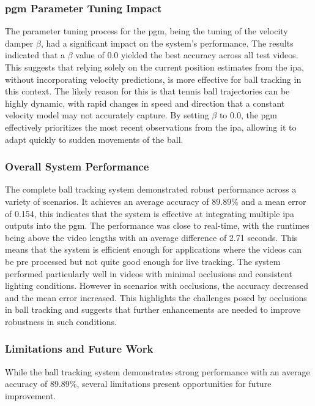 \documentclass[12pt,a4paper]{article}
\begin{document}
\subsubsection{\acs{pgm} Parameter Tuning Impact}
The parameter tuning process for the \acs{pgm}, being the tuning of the velocity damper $\beta$, had a significant impact on the system's performance. The results indicated that a $\beta$ value of 0.0 yielded the best accuracy across all test videos. This suggests that relying solely on the current position estimates from the \acs{ipa}, without incorporating velocity predictions, is more effective for ball tracking in this context. The likely reason for this is that tennis ball trajectories can be highly dynamic, with rapid changes in speed and direction that a constant velocity model may not accurately capture. By setting $\beta$ to 0.0, the \acs{pgm} effectively prioritizes the most recent observations from the \acs{ipa}, allowing it to adapt quickly to sudden movements of the ball.

\subsubsection{Overall System Performance}
The complete ball tracking system demonstrated robust performance across a variety of scenarios. It achieves an average accuracy of 89.89\% and a mean error of 0.154, this indicates that the system is effective at integrating multiple \acs{ipa} outputs into the \acs{pgm}. The performance was close to real-time, with the runtimes being above the video lengths with an average difference of 2.71 seconds. This means that the system is efficient enough for applications where the videos can be pre processed but not quite good enough for live tracking. The system performed particularly well in videos with minimal occlusions and consistent lighting conditions. However in scenarios with occlusions, the accuracy decreased and the mean error increased. This highlights the challenges posed by occlusions in ball tracking and suggests that further enhancements are needed to improve robustness in such conditions.

\subsubsection{Limitations and Future Work}
While the ball tracking system demonstrates strong performance with an average accuracy of 89.89\%, several limitations present opportunities for future improvement.
\end{document}
